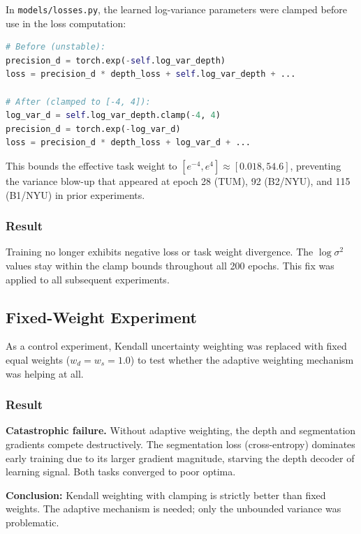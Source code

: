 \documentclass[11pt,a4paper]{article}
\begin{document}
In \texttt{models/losses.py}, the learned log-variance parameters were clamped
before use in the loss computation:

\begin{lstlisting}[language=Python]
# Before (unstable):
precision_d = torch.exp(-self.log_var_depth)
loss = precision_d * depth_loss + self.log_var_depth + ...

# After (clamped to [-4, 4]):
log_var_d = self.log_var_depth.clamp(-4, 4)
precision_d = torch.exp(-log_var_d)
loss = precision_d * depth_loss + log_var_d + ...
\end{lstlisting}

This bounds the effective task weight to $[e^{-4}, e^{4}] \approx [0.018, 54.6]$,
preventing the variance blow-up that appeared at epoch 28 (TUM), 92 (B2/NYU),
and 115 (B1/NYU) in prior experiments.

\subsubsection{Result}

Training no longer exhibits negative loss or task weight divergence. The
$\log \sigma^2$ values stay within the clamp bounds throughout all 200 epochs.
This fix was applied to all subsequent experiments.

\subsection{Fixed-Weight Experiment}
\label{sec:vivek-fixed-weight}

As a control experiment, Kendall uncertainty weighting was replaced with fixed
equal weights ($w_d = w_s = 1.0$) to test whether the adaptive weighting
mechanism was helping at all.

\subsubsection{Result}

\textbf{Catastrophic failure.} Without adaptive weighting, the depth and
segmentation gradients compete destructively. The segmentation loss (cross-entropy)
dominates early training due to its larger gradient magnitude, starving the depth
decoder of learning signal. Both tasks converged to poor optima.

\textbf{Conclusion:} Kendall weighting with clamping is strictly better than
fixed weights. The adaptive mechanism is needed; only the unbounded variance
was problematic.
\end{document}
